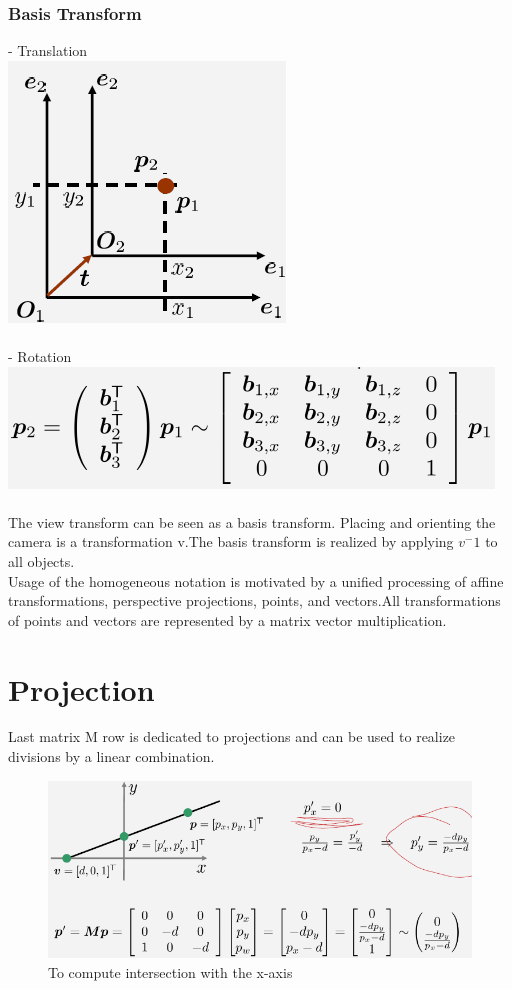 \documentclass{article}
\begin{document}
\subsubsection{Basis Transform}
- Translation\\
\includegraphics[scale=0.6]{image33.png}\\\\
- Rotation\\
\includegraphics[scale=0.6]{image34.png}\\\\
The view transform can be seen as a basis transform. Placing and orienting the camera is a transformation v.The basis transform is realized by applying $v^-1$ to all objects.\\
Usage of the homogeneous notation is motivated by a unified processing of affine transformations, perspective projections, points, and vectors.All transformations of points and vectors are represented by a matrix vector multiplication.\\

\section{Projection}
Last matrix M row is dedicated to projections and can be used to realize divisions by a linear combination.\\
\begin{figure}
\includegraphics[scale=0.6]{image35.png}
\caption{To compute intersection with the x-axis}
\end{figure}
\end{document}
